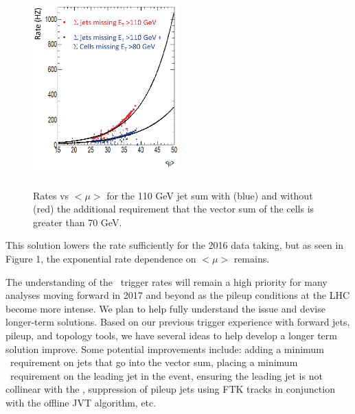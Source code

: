 \begin{figure}[htb]
\centering
\includegraphics[height=3in, width=0.50\textwidth]{images/met-growth-labc.eps}
\caption[]{Rates vs $<\mu>$ for the 110 GeV jet sum with (blue) and without (red) the additional requirement that the vector sum of the cells is greater than 70 GeV.}
\label{fig:mettrigger}
\end{figure}  


This solution lowers the rate sufficiently for the 2016 data taking, but as seen in Figure 1, the exponential rate dependence on  $<\mu>$ remains.  

The understanding of the \met\ trigger rates will remain a high priority for many analyses moving forward in 2017 and beyond as the pileup conditions at the LHC become more intense.  We plan to help fully understand the issue and devise longer-term solutions.  Based on our previous trigger experience with forward jets, pileup, and topology tools, we have several ideas to help develop a longer term solution improve. Some potential improvements include:   adding a minimum \pt\ requirement on jets that go into the vector sum, placing a minimum \pt\ requirement on the leading jet in the event, ensuring the leading jet is not collinear with the \met, suppression of pileup jets using FTK tracks in conjunction with the offline JVT algorithm, etc. 
